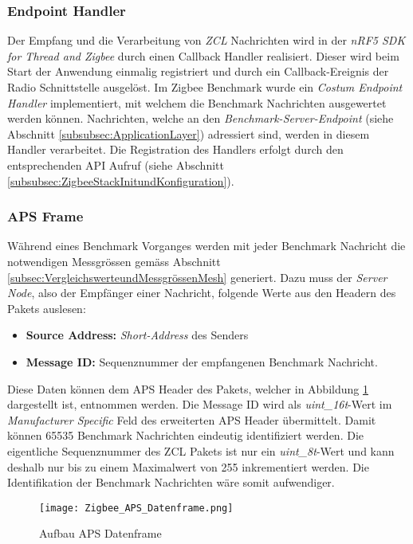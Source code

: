 \subsubsection{Endpoint Handler}\label{subsubsec:EnpointHandler}
Der Empfang und die Verarbeitung von \textit{ZCL} Nachrichten wird in der \textit{nRF5 SDK for Thread and Zigbee} durch einen Callback Handler realisiert.
Dieser wird beim Start der Anwendung einmalig registriert und durch ein Callback-Ereignis der Radio Schnittstelle ausgelöst.
Im Zigbee Benchmark wurde ein \textit{Costum Endpoint Handler} implementiert, mit welchem die Benchmark Nachrichten ausgewertet werden können.
Nachrichten, welche an den \textit{Benchmark-Server-Endpoint} (siehe Abschnitt \ref{subsubsec:ApplicationLayer}) adressiert sind, werden in diesem Handler verarbeitet.
Die Registration des Handlers erfolgt durch den entsprechenden API Aufruf (siehe Abschnitt \ref{subsubsec:ZigbeeStackInitundKonfiguration}).

\subsubsection{APS Frame}\label{subsubsec:ZigbeeAPSFrame}
Während eines Benchmark Vorganges werden mit jeder Benchmark Nachricht die notwendigen Messgrössen gemäss Abschnitt \ref{subsec:VergleichswerteundMessgrössenMesh} generiert.
Dazu muss der \textit{Server Node}, also der Empfänger einer Nachricht, folgende Werte aus den Headern des Pakets auslesen:

\begin{itemize}
\item \textbf{Source Address:} \textit{Short-Address} des Senders
\item \textbf{Message ID:} Sequenznummer der empfangenen Benchmark Nachricht.
\end{itemize}

Diese Daten können dem APS Header des Pakets, welcher in Abbildung \ref{fig:AufbauAPSDatenframe} dargestellt ist, entnommen werden.
Die Message ID wird als \textit{uint\_16t}-Wert im \textit{Manufacturer Specific} Feld des erweiterten APS Header übermittelt.
Damit können 65535 Benchmark Nachrichten eindeutig identifiziert werden.
Die eigentliche Sequenznummer des ZCL Pakets ist nur ein \textit{uint\_8t}-Wert und kann deshalb nur bis zu einem Maximalwert von 255 inkrementiert werden.
Die Identifikation der Benchmark Nachrichten wäre somit aufwendiger.

\begin{figure}[h]
	\centering
	\texttt{[image: Zigbee\_APS\_Datenframe.png]}
	\caption{Aufbau APS Datenframe \cite{markus_krause_rainer_konrad_drahtlose_2014}}
	\label{fig:AufbauAPSDatenframe}
\end{figure}


